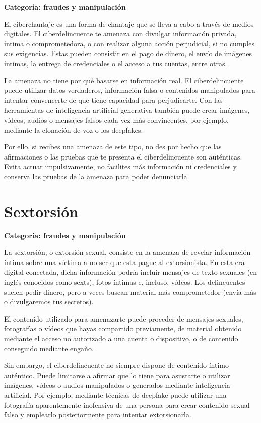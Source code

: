 \documentclass[
  spanish,
  a4paper,
  openany]{book}
\begin{document}
\textbf{Categoría: fraudes y manipulación}

El ciberchantaje es una forma de chantaje que se lleva a cabo a través de medios digitales. El ciberdelincuente te amenaza con divulgar información privada, íntima o comprometedora, o con realizar alguna acción perjudicial, si no cumples sus exigencias. Estas pueden consistir en el pago de dinero, el envío de imágenes íntimas, la entrega de credenciales o el acceso a tus cuentas, entre otras.

La amenaza no tiene por qué basarse en información real. El ciberdelincuente puede utilizar datos verdaderos, información falsa o contenidos manipulados para intentar convencerte de que tiene capacidad para perjudicarte. Con las herramientas de inteligencia artificial generativa también puede crear imágenes, vídeos, audios o mensajes falsos cada vez más convincentes, por ejemplo, mediante la clonación de voz o los deepfakes.

Por ello, si recibes una amenaza de este tipo, no des por hecho que las afirmaciones o las pruebas que te presenta el ciberdelincuente son auténticas. Evita actuar impulsivamente, no facilites más información ni credenciales y conserva las pruebas de la amenaza para poder denunciarla.

\section{Sextorsión}\label{sextorsiuxf3n}

\textbf{Categoría: fraudes y manipulación}

La sextorsión, o extorsión sexual, consiste en la amenaza de revelar información íntima sobre una víctima a no ser que esta pague al extorsionista. En esta era digital conectada, dicha información podría incluir mensajes de texto sexuales (en inglés conocidos como sexts), fotos íntimas e, incluso, vídeos. Los delincuentes suelen pedir dinero, pero a veces buscan material más comprometedor (envía más o divulgaremos tus secretos)\citep{KASPER-sextorsion}.

El contenido utilizado para amenazarte puede proceder de mensajes sexuales, fotografías o vídeos que hayas compartido previamente, de material obtenido mediante el acceso no autorizado a una cuenta o dispositivo, o de contenido conseguido mediante engaño.

Sin embargo, el ciberdelincuente no siempre dispone de contenido íntimo auténtico. Puede limitarse a afirmar que lo tiene para asustarte o utilizar imágenes, vídeos o audios manipulados o generados mediante inteligencia artificial. Por ejemplo, mediante técnicas de deepfake puede utilizar una fotografía aparentemente inofensiva de una persona para crear contenido sexual falso y emplearlo posteriormente para intentar extorsionarla.
\end{document}
